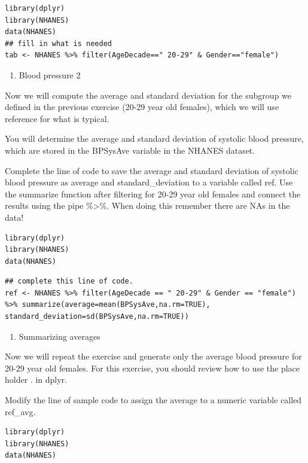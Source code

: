 \documentclass[
]{article}
\providecommand{\tightlist}{%
  \setlength{\itemsep}{0pt}\setlength{\parskip}{0pt}}
\begin{document}
\begin{verbatim}
library(dplyr)
library(NHANES)
data(NHANES)
## fill in what is needed
tab <- NHANES %>% filter(AgeDecade==" 20-29" & Gender=="female")
\end{verbatim}

\begin{enumerate}
\def\labelenumi{\arabic{enumi}.}
\setcounter{enumi}{1}
\tightlist
\item
  Blood pressure 2
\end{enumerate}

Now we will compute the average and standard deviation for the subgroup
we defined in the previous exercise (20-29 year old females), which we
will use reference for what is typical.

You will determine the average and standard deviation of systolic blood
pressure, which are stored in the BPSysAve variable in the NHANES
dataset.

Complete the line of code to save the average and standard deviation of
systolic blood pressure as average and standard\_deviation to a variable
called ref. Use the summarize function after filtering for 20-29 year
old females and connect the results using the pipe \%\textgreater\%.
When doing this remember there are NAs in the data!

\begin{verbatim}
library(dplyr)
library(NHANES)
data(NHANES)
\end{verbatim}

\begin{verbatim}
## complete this line of code.
ref <- NHANES %>% filter(AgeDecade == " 20-29" & Gender == "female") %>% summarize(average=mean(BPSysAve,na.rm=TRUE), standard_deviation=sd(BPSysAve,na.rm=TRUE))
\end{verbatim}

\begin{enumerate}
\def\labelenumi{\arabic{enumi}.}
\setcounter{enumi}{2}
\tightlist
\item
  Summarizing averages
\end{enumerate}

Now we will repeat the exercise and generate only the average blood
pressure for 20-29 year old females. For this exercise, you should
review how to use the place holder . in dplyr.

Modify the line of sample code to assign the average to a numeric
variable called ref\_avg.

\begin{verbatim}
library(dplyr)
library(NHANES)
data(NHANES)
\end{verbatim}
\end{document}
